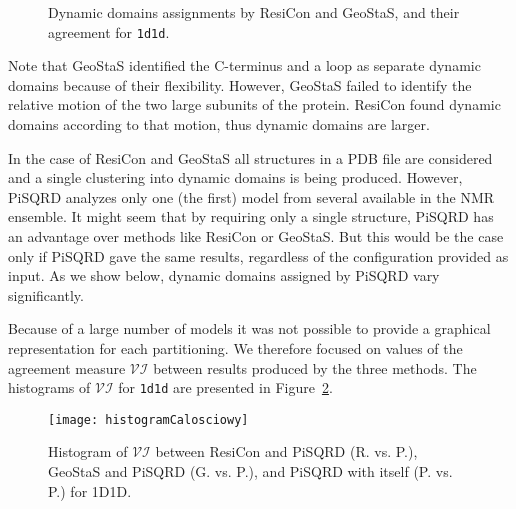 \documentclass[a4paper,11pt,twoside]{book}%
\begin{document}
\begin{appendices}
\begin{figure}[h!]
\begin{minipage}{\linewidth}
\begin{minipage}{0.9\linewidth}
\begin{minipage}{\linewidth}
\end{minipage}
\end{minipage}
\end{minipage}
\caption{Dynamic domains assignments by ResiCon and GeoStaS, and their agreement for \texttt{1d1d}.}
\label{1d1dResiConVsGeoStaS}
\end{figure}

Note that GeoStaS identified the C-terminus and a loop as separate dynamic domains because of their flexibility.
However, GeoStaS failed to identify the relative motion of the two large subunits of the protein.
ResiCon found dynamic domains according to that motion, thus dynamic domains are larger.

In the case of ResiCon and GeoStaS all structures in a PDB file are considered and a single clustering into dynamic domains is being produced.
However, PiSQRD analyzes only one (the first) model from several available in the NMR ensemble.
It might seem that by requiring only a single structure, PiSQRD has an advantage over methods like ResiCon or GeoStaS.
But this would be the case only if PiSQRD gave the same results, regardless of the configuration provided as input.
As we show below, dynamic domains assigned by PiSQRD vary significantly.

Because of a large number of models it was not possible to provide a graphical representation for each partitioning.
We therefore focused on values of the agreement measure $\mathcal{VI}$ between results produced by the three methods.
The histograms of $\mathcal{VI}$ for \texttt{1d1d} are presented in Figure~\ref{histogram}.

\begin{figure}[h!]
\begin{center}
\texttt{[image: histogramCalosciowy]}
\caption{Histogram of $\mathcal{VI}$ between ResiCon and PiSQRD (R. vs. P.), GeoStaS and PiSQRD (G. vs. P.), and PiSQRD with itself (P. vs. P.) for 1D1D.}
\label{histogram}
\end{center}
\end{figure}




\end{appendices}
\end{document}
